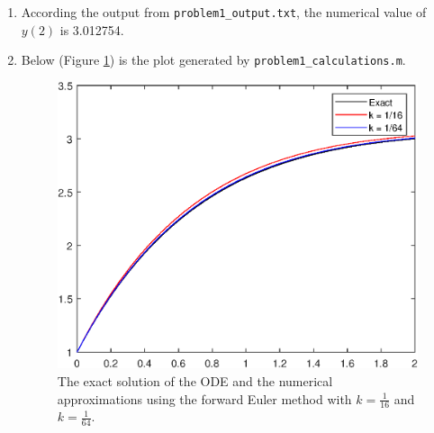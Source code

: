 \documentclass{homework}
\begin{document}
\begin{arabicparts}
\begin{enumerate}[label=({\bf\alph*})]
			\item According the output from \lstinline{problem1_output.txt}, the numerical value of $y(2)$ is 3.012754.
			\item Below (Figure \ref{fig:p12c}) is the plot generated by \lstinline{problem1_calculations.m}.
			\begin{figure}[h]
				\centering
				\includegraphics{p1.2c.eps}
				\caption{The exact solution of the ODE and the numerical approximations using the forward Euler method with $k = \frac{1}{16}$ and $k = \frac{1}{64}$.}
				\label{fig:p12c}
			\end{figure}
		\end{enumerate}
		

\end{arabicparts}
\end{document}
